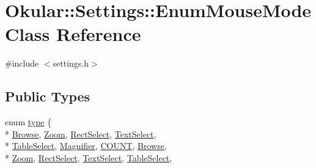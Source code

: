 \hypertarget{classOkular_1_1Settings_1_1EnumMouseMode}{\section{Okular\+:\+:Settings\+:\+:Enum\+Mouse\+Mode Class Reference}
\label{classOkular_1_1Settings_1_1EnumMouseMode}
}


{\ttfamily \#include $<$settings.\+h$>$}

\subsection*{Public Types}
\begin{DoxyCompactItemize}
\item 
enum \hyperlink{classOkular_1_1Settings_1_1EnumMouseMode_ab2ae04e2d7d069f02195ccf32c52415b}{type} \{ \\*
\hyperlink{classOkular_1_1Settings_1_1EnumMouseMode_ab2ae04e2d7d069f02195ccf32c52415bae5c77f74b0cf35d7838da1baaad4e822}{Browse}, 
\hyperlink{classOkular_1_1Settings_1_1EnumMouseMode_ab2ae04e2d7d069f02195ccf32c52415ba02b6269995c57d3fa3c40c5301591e62}{Zoom}, 
\hyperlink{classOkular_1_1Settings_1_1EnumMouseMode_ab2ae04e2d7d069f02195ccf32c52415baa9bf3100d0e93abfec2769957743e6a2}{Rect\+Select}, 
\hyperlink{classOkular_1_1Settings_1_1EnumMouseMode_ab2ae04e2d7d069f02195ccf32c52415bafafb47a3dab02c4016246ee80090e2d9}{Text\+Select}, 
\\*
\hyperlink{classOkular_1_1Settings_1_1EnumMouseMode_ab2ae04e2d7d069f02195ccf32c52415ba5422065f9d7eff6cc08eef755e862af3}{Table\+Select}, 
\hyperlink{classOkular_1_1Settings_1_1EnumMouseMode_ab2ae04e2d7d069f02195ccf32c52415bab95111677f0c566414f48ece94ce0f45}{Magnifier}, 
\hyperlink{classOkular_1_1Settings_1_1EnumMouseMode_ab2ae04e2d7d069f02195ccf32c52415ba959a01ba34bcd067ac500be15718742d}{C\+O\+U\+N\+T}, 
\hyperlink{classOkular_1_1Settings_1_1EnumMouseMode_ab2ae04e2d7d069f02195ccf32c52415bae5c77f74b0cf35d7838da1baaad4e822}{Browse}, 
\\*
\hyperlink{classOkular_1_1Settings_1_1EnumMouseMode_ab2ae04e2d7d069f02195ccf32c52415ba02b6269995c57d3fa3c40c5301591e62}{Zoom}, 
\hyperlink{classOkular_1_1Settings_1_1EnumMouseMode_ab2ae04e2d7d069f02195ccf32c52415baa9bf3100d0e93abfec2769957743e6a2}{Rect\+Select}, 
\hyperlink{classOkular_1_1Settings_1_1EnumMouseMode_ab2ae04e2d7d069f02195ccf32c52415bafafb47a3dab02c4016246ee80090e2d9}{Text\+Select}, 
\hyperlink{classOkular_1_1Settings_1_1EnumMouseMode_ab2ae04e2d7d069f02195ccf32c52415ba5422065f9d7eff6cc08eef755e862af3}{Table\+Select}, 

\end{DoxyCompactItemize}
